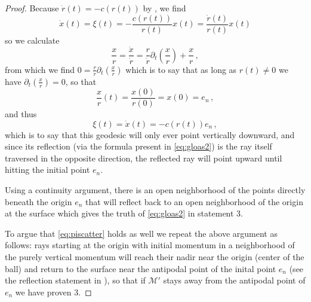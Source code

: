 \documentclass[
	fontsize=11pt, 
	twoside=false, 
	abstract=true, 
	a4paper,
]{scrartcl}
\newcommand{\eps}{\varepsilon}
\newcommand{\del}{\partial}
\begin{document}
\begin{proof}
	Because $\dot r(t) = -c(r(t))$ by \cite[Eq.~(2.10)]{zbMATH07625517}, we find
	\[
		\dot x(t) = \xi(t) = -\frac{c(r(t))}{r(t)}x(t) = \frac{\dot r(t)}{r(t)}x(t)
	\]
	so we calculate
	\[
		\frac{x}{r} = \frac{\dot x}{\dot r} = \frac{r}{\dot r}\del_t\left(\frac{x}{r}\right) + \frac{x}{r}\,,
	\]
	from which we find $0= \frac{r}{\dot r}\del_t\left(\frac{x}{r}\right)$ which is to say that as long as $r(t) \neq 0$ we have $\del_t(\frac{x}{r}) = 0$, so that
	\[
		\frac{x}{r}(t) = \frac{x(0)}{r(0)} = x(0) = e_n\,,
	\]
	and thus 
	\[
		\xi(t) = \dot x(t) = -c(r(t))e_n\,,
	\]
	which is to say that this geodesic will only ever point vertically downward, and since its reflection (via the formula present in \cref{eq:gloas2}) is the ray itself traversed in the opposite direction, the reflected ray will point upward until hitting the initial point $e_n$. 

	Using a continuity argument, there is an open neighborhood of the points directly beneath the origin $e_n$ that will reflect back to an open neighborhood of the origin at the surface which gives the truth of \cref{eq:gloas2} in statement 3.

	To argue that \cref{eq:piscatter} holds as well we repeat the above argument as follows: rays starting at the origin with initial momentum in a neighborhood of the purely vertical momentum will reach their nadir near the origin (center of the ball) and return to the surface near the antipodal point of the inital point $e_n$ (see the reflection statement in \cite[Thm.~2.1.6]{zbMATH07625517}), so that if $\mathcal{M}'$ stays away from the antipodal point of $e_n$ we have proven 3.
\end{proof}





\printbibliography[title=Bibliography] %
\end{document}
